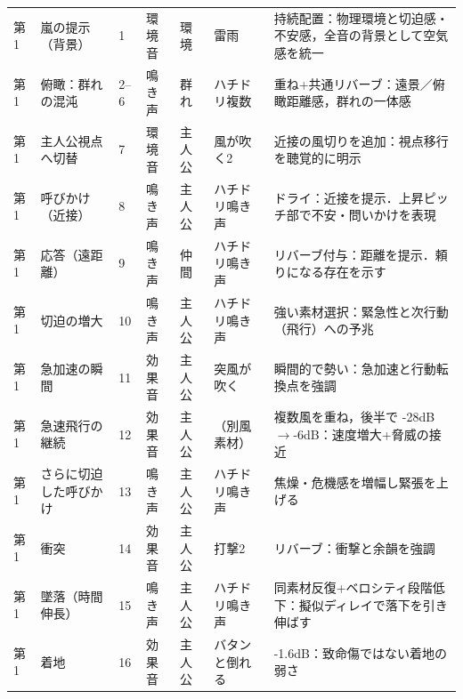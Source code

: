 \begin{longtable}{p{0.6cm} p{2.8cm} p{1.6cm} p{1.5cm} p{1.5cm} p{3.0cm} p{4.1cm}}
	第1          & 嵐の提示（背景）             & 1                       & 環境音         & 環境            & 雷雨                                        & 持続配置：物理環境と切迫感・不安感，全音の背景として空気感を統一             \\
	第1          & 俯瞰：群れの混沌             & 2--6                    & 鳴き声         & 群れ            & ハチドリ複数                                    & 重ね+共通リバーブ：遠景／俯瞰距離感，群れの一体感                    \\
	第1          & 主人公視点へ切替             & 7                       & 環境音         & 主人公           & 風が吹く2                                     & 近接の風切りを追加：視点移行を聴覚的に明示                        \\
	第1          & 呼びかけ（近接）             & 8                       & 鳴き声         & 主人公           & ハチドリ鳴き声                                   & ドライ：近接を提示．上昇ピッチ部で不安・問いかけを表現                  \\
	第1          & 応答（遠距離）              & 9                       & 鳴き声         & 仲間            & ハチドリ鳴き声                                   & リバーブ付与：距離を提示．頼りになる存在を示す                      \\
	第1          & 切迫の増大                & 10                      & 鳴き声         & 主人公           & ハチドリ鳴き声                                   & 強い素材選択：緊急性と次行動（飛行）への予兆                       \\
	第1          & 急加速の瞬間               & 11                      & 効果音         & 主人公           & 突風が吹く                                     & 瞬間的で勢い：急加速と行動転換点を強調                          \\
	第1          & 急速飛行の継続              & 12                      & 効果音         & 主人公           & （別風素材）                                    & 複数風を重ね，後半で -28dB$\to$-6dB：速度増大+脅威の接近         \\
	第1          & さらに切迫した呼びかけ          & 13                      & 鳴き声         & 主人公           & ハチドリ鳴き声                                   & 焦燥・危機感を増幅し緊張を上げる                             \\
	第1          & 衝突                   & 14                      & 効果音         & 主人公           & 打撃2                                       & リバーブ：衝撃と余韻を強調                                \\
	第1          & 墜落（時間伸長）             & 15                      & 鳴き声         & 主人公           & ハチドリ鳴き声                                   & 同素材反復+ベロシティ段階低下：擬似ディレイで落下を引き伸ばす              \\
	第1          & 着地                   & 16                      & 効果音         & 主人公           & バタンと倒れる                                   & -1.6dB：致命傷ではない着地の弱さ                          \\


\end{longtable}
